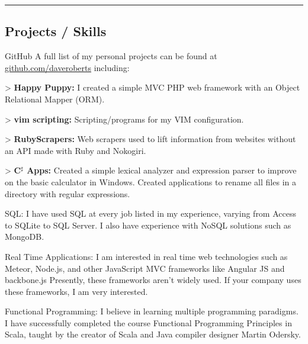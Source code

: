 \documentclass[10pt,letterpaper]{article}
\newenvironment{indentsection}[1]%
{\begin{list}{}%
	{\setlength{\leftmargin}{#1}}%
	\item[]%
}
{\end{list}}
\begin{document}
\hrule
\vspace{-0.4em}
\subsection*{Projects / Skills}

\begin{indentsection}{\parindent}
\begin{description*}
	\item[GitHub]
	A full list of my personal projects can be found at \href{http://github.com/daveroberts}{github.com/daveroberts} including:
	\begin{itemize*}
    \item[>] \textbf{Happy Puppy: }I created a simple {\color{blue} MVC PHP} web framework with an Object Relational Mapper (ORM).
    \item[>] \textbf{vim scripting: }Scripting/programs for my {\color{blue} VIM} configuration.
    \item[>] \textbf{RubyScrapers: }Web scrapers used to lift information from websites without an API made with Ruby and Nokogiri.
    \item[>] \textbf{C$^\sharp$ Apps: }Created a simple lexical analyzer and expression parser to improve on the basic calculator in Windows.  Created applications to rename all files in a directory with regular expressions.
	\end{itemize*}
	\item[SQL:]I have used SQL at every job listed in my experience, varying from Access to SQLite to SQL Server.  I also have experience with {\color{blue} NoSQL} solutions such as {\color{blue} MongoDB}.
	\item[Real Time Applications:]I am interested in real time web technologies such as {\color{blue} Meteor}, {\color{blue} Node.js}, and other JavaScript MVC frameworks like {\color{blue} Angular JS} and {\color{blue} backbone.js}  Presently, these frameworks aren't widely used.  If your company uses these frameworks, I am very interested.
	\item[Functional Programming:]I believe in learning multiple programming paradigms.  I have successfully completed the course {\color{blue} Functional Programming Principles in Scala}, taught by the creator of Scala and Java compiler designer Martin Odersky.

\end{description*}
\end{indentsection}
\end{document}
